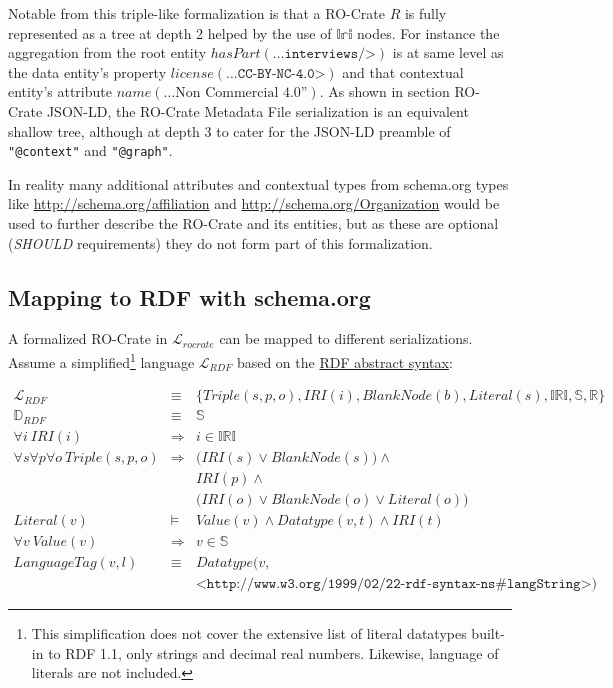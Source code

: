 Notable from this triple-like formalization is that a RO-Crate $R$ is fully represented as a tree at depth 2 helped by the use of $𝕀𝕣𝕚$ nodes. For instance the aggregation from the root entity $hasPart(\texttt{…interviews/>})$ is at same level as the data entity’s property $license(\texttt{…CC-BY-NC-4.0>})$ and that contextual entity’s attribute $ name(\text{…Non Commercial 4.0”})$. As shown in section RO-Crate JSON-LD, the RO-Crate Metadata File serialization is an equivalent shallow tree, although at depth 3 to cater for the JSON-LD preamble of \texttt{"@context"} and \texttt{"@graph"}.

In reality many additional attributes and contextual types from schema.org types like \url{http://schema.org/affiliation} and \url{http://schema.org/Organization} would be used to further describe the RO-Crate and its entities, but as these are optional (\textit{SHOULD} requirements) they do not form part of this formalization.


\subsection{Mapping to RDF with schema.org}

A formalized RO-Crate in $\mathcal{L}_{rocrate}$ can be mapped to different serializations.
Assume a simplified\footnote{
 This simplification does not cover the extensive list of literal datatypes built-in to RDF 1.1, only strings and decimal real numbers. Likewise, language of literals are not included.
} language $\mathcal{L}_{RDF}$
based on the \href{http://www.w3.org/TR/2014/REC-rdf11-concepts-20140225/}{RDF abstract syntax}:

\begin{eqnarray*}
\mathcal{L}_{RDF}           & \equiv &      \big\{ Triple(s,p,o), IRI(i), BlankNode(b), Literal(s),
    \mathbb{IRI}, \mathbb{S}, \mathbb{R}    \big\} \\
\mathbb{D}_{RDF}            & \equiv &      \mathbb{S} \\
\forall i \ IRI(i)          & \Rightarrow & i \in \mathbb{IRI} \\
\forall s \forall p \forall o \
    Triple(s,p,o)           & \Rightarrow & \Big( IRI(s) \lor BlankNode(s) \Big) \land  \\
                            & &             IRI(p) \land  \\
                            & &             \Big(IRI(o) \lor BlankNode(o) \lor Literal(o) \Big) \\
Literal(v)                  & \models &     Value(v) \land Datatype(v,t) \land IRI(t) \\
\forall v \ Value(v)        & \Rightarrow & v \in \mathbb{S} \\
LanguageTag(v, l)           & \equiv &      Datatype\big(v, \\
    && \texttt{<http://www.w3.org/1999/02/22-rdf-syntax-ns#langString>}\big)
\end{eqnarray*}

